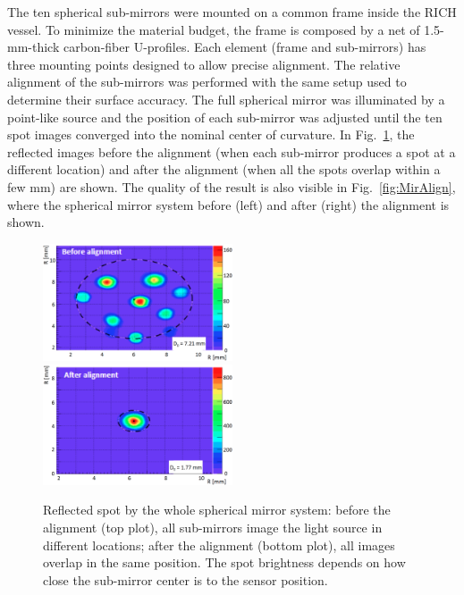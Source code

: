 \documentclass[5p,times,twocolumn]{elsarticle}
\begin{document}
The ten spherical sub-mirrors were mounted on a common frame inside the RICH vessel. To
minimize the material budget, the frame is composed by a net of 1.5-mm-thick carbon-fiber U-profiles. Each element
(frame and sub-mirrors) has three mounting points designed to allow precise alignment. The relative alignment of
the sub-mirrors was performed with the same setup used to determine their surface accuracy. The full spherical
mirror was illuminated by a point-like source and the position of each sub-mirror was adjusted until the ten spot images
converged into the nominal center of curvature. In Fig.~\ref{fig:MirSpots}, the reflected images before the alignment
(when each sub-mirror produces a spot at a different location) and after the alignment (when all the spots overlap
within a few mm) are shown. The quality of the result is also visible in Fig.~\ref{fig:MirAlign}, where the spherical
mirror system before (left) and after (right) the alignment is shown.

\begin{figure}
\begin{center}
\includegraphics[width=0.50\textwidth]{mirror_spot1.png}
\includegraphics[width=0.50\textwidth]{mirror_spot2.png}
\caption{Reflected spot by the whole spherical mirror system: before the alignment (top plot), all sub-mirrors
  image the light source in different locations; after the alignment (bottom plot), all images overlap in the same
  position. The spot brightness depends on how close the sub-mirror center is to the sensor position.}
\label{fig:MirSpots}
\end{center}
\end{figure}
\end{document}
